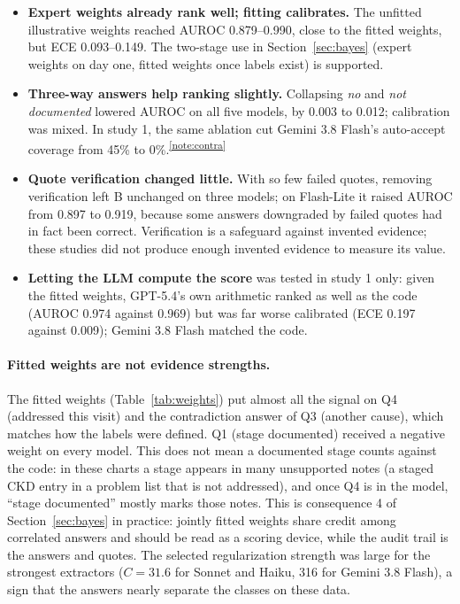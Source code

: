 \documentclass[10pt,letterpaper]{article}
\newcommand{\nd}{\textit{not documented}}
\newcommand{\tnote}[1]{\textsuperscript{\hyperref[note:#1]{\ref*{note:#1}}}}
\begin{document}
\begin{itemize}
  \item \textbf{Expert weights already rank well; fitting calibrates.} The unfitted illustrative weights reached AUROC 0.879--0.990, close to the fitted weights, but ECE 0.093--0.149. The two-stage use in Section~\ref{sec:bayes} (expert weights on day one, fitted weights once labels exist) is supported.
  \item \textbf{Three-way answers help ranking slightly.} Collapsing \textit{no} and \nd{} lowered AUROC on all five models, by 0.003 to 0.012; calibration was mixed. In study 1, the same ablation cut Gemini 3.8 Flash's auto-accept coverage from 45\% to 0\%.\tnote{contra}
  \item \textbf{Quote verification changed little.} With so few failed quotes, removing verification left B unchanged on three models; on Flash-Lite it raised AUROC from 0.897 to 0.919, because some answers downgraded by failed quotes had in fact been correct. Verification is a safeguard against invented evidence; these studies did not produce enough invented evidence to measure its value.
  \item \textbf{Letting the LLM compute the score} was tested in study 1 only: given the fitted weights, GPT-5.4's own arithmetic ranked as well as the code (AUROC 0.974 against 0.969) but was far worse calibrated (ECE 0.197 against 0.009); Gemini 3.8 Flash matched the code.
\end{itemize}

\paragraph{Fitted weights are not evidence strengths.} The fitted weights (Table~\ref{tab:weights}) put almost all the signal on Q4 (addressed this visit) and the contradiction answer of Q3 (another cause), which matches how the labels were defined. Q1 (stage documented) received a negative weight on every model. This does not mean a documented stage counts against the code: in these charts a stage appears in many unsupported notes (a staged CKD entry in a problem list that is not addressed), and once Q4 is in the model, ``stage documented'' mostly marks those notes. This is consequence 4 of Section~\ref{sec:bayes} in practice: jointly fitted weights share credit among correlated answers and should be read as a scoring device, while the audit trail is the answers and quotes. The selected regularization strength was large for the strongest extractors ($C=31.6$ for Sonnet and Haiku, 316 for Gemini 3.8 Flash), a sign that the answers nearly separate the classes on these data.
\end{document}
